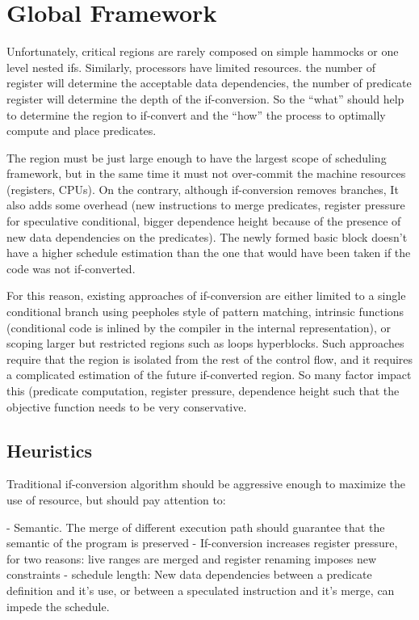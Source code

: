 \section{Global Framework}

Unfortunately, critical regions are rarely composed on simple hammocks or one level nested ifs. Similarly, processors have limited resources. the number of register will determine the acceptable data dependencies, the number of predicate register will determine the depth of the if-conversion. So the ``what'' should help to determine the region to if-convert and the ``how'' the process to optimally compute and place predicates.

The region must be just large enough to have the largest scope of scheduling framework, but in the same time it must not over-commit the machine resources (registers, CPUs). On the contrary, although if-conversion removes branches, It also adds some overhead (new instructions to merge predicates, register pressure for speculative conditional, bigger dependence height because of the presence of new data dependencies on the predicates). The newly formed basic block doesn't have a higher schedule estimation than the one that would have been taken if the code was not if-converted.

For this reason, existing approaches of if-conversion are either limited to a single conditional branch using peepholes style of pattern matching, intrinsic functions (conditional code is inlined by the compiler in the internal representation), or scoping larger but restricted regions such as loops hyperblocks. Such approaches require that the region is isolated from the rest of the control flow, and it requires a complicated estimation of the future if-converted region. So many factor impact this (predicate computation, register pressure, dependence height such that the objective function needs to be very conservative.

\subsection{Heuristics}

Traditional if-conversion algorithm should be aggressive enough to maximize the use of resource, but should pay attention to:

- Semantic. The merge of different execution path should guarantee that the semantic of the program is preserved
- If-conversion increases register pressure, for two reasons: live ranges are merged and register renaming imposes new constraints
- schedule length: New data dependencies between a predicate definition and it's use, or between a speculated instruction and it's merge, can impede the schedule.

